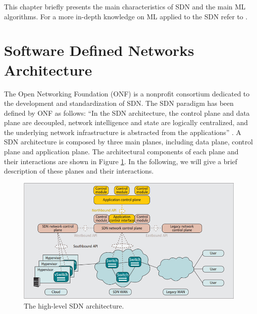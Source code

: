 This chapter briefly presents the main characteristics of SDN and the main ML algorithms. For a more in-depth knowledge on ML applied to the SDN refer to \cite{Xie2019}.
\section{Software Defined Networks Architecture} \label{sec:SDN_BGK}
The Open Networking Foundation (ONF) \cite{ONF} is a nonprofit consortium dedicated to the development and standardization of SDN. The SDN paradigm has been defined by ONF as follows: “In the SDN architecture, the control plane and data plane are decoupled, network intelligence and state are logically centralized, and the underlying network infrastructure is abstracted from the applications” \cite{Sezer2013}.
A SDN architecture is composed by three main planes, including data plane, control plane and application plane. The architectural components of each plane and their interactions are shown in Figure \ref{fig:{ONF}}. In the following, we will give a brief description of these planes and their interactions.
\begin{figure}[tb!]
	\centering
	\includegraphics[width=13cm]{figure/ONF.png}
	\caption{The high-level SDN architecture.}
	\label{fig:{ONF}}
\end{figure}

